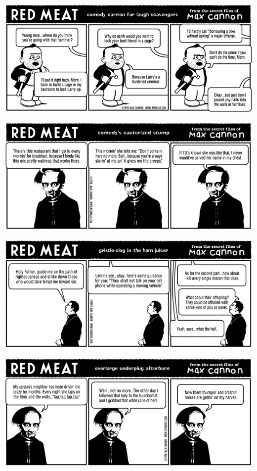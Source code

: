 \documentclass[a4paper,twoside,11pt]{article}
\begin{document}
\includegraphics[width=\textwidth]{redmeat_1999-01-18.png}



\includegraphics[width=\textwidth]{redmeat_1999-01-25.png}



\includegraphics[width=\textwidth]{redmeat_1999-02-01.png}



\includegraphics[width=\textwidth]{redmeat_1999-02-08.png}
\end{document}
